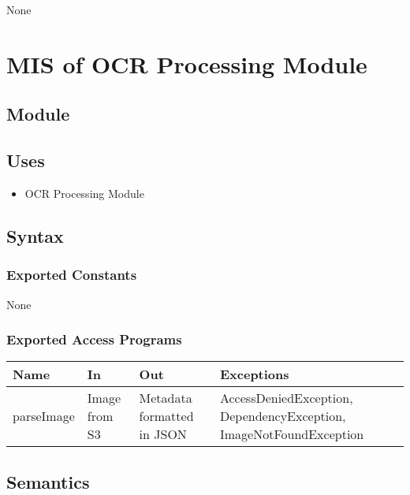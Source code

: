 \documentclass[12pt, titlepage]{article}
\begin{document}
None

\newpage


\section{MIS of OCR Processing Module} \label{Module}

\subsection{Module}

\subsection{Uses}

\begin{itemize}
  \item OCR Processing Module
\end{itemize}

\subsection{Syntax}

\subsubsection{Exported Constants}

None

\subsubsection{Exported Access Programs}

\begin{center}
\begin{tabular}{p{2cm} p{4cm} p{4cm} p{2cm}}
\hline
\textbf{Name} & \textbf{In} & \textbf{Out} & \textbf{Exceptions} \\
\hline
parseImage & Image from S3 & Metadata formatted in JSON & AccessDeniedException, DependencyException, ImageNotFoundException \\
\hline
\end{tabular}
\end{center}

\subsection{Semantics}
\end{document}
